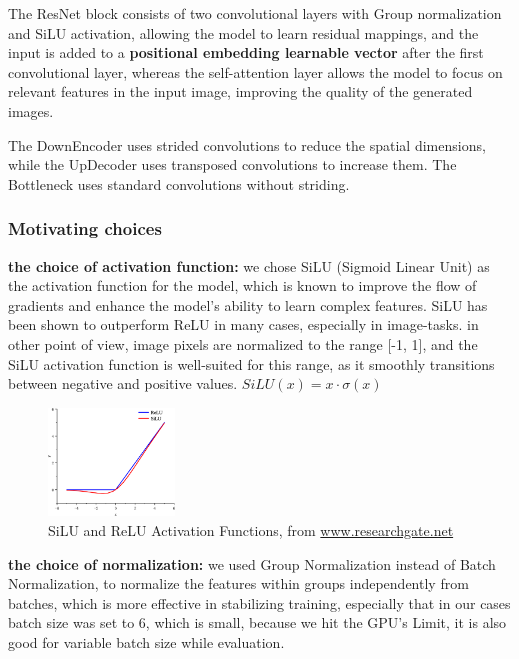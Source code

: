 \documentclass[twocolumn,superscriptaddress,aps]{revtex4-1}
\begin{document}
The ResNet block consists of two convolutional layers with Group normalization and SiLU activation, allowing the model to learn residual mappings, and the input is added to a \textbf{positional embedding learnable vector} after the first convolutional layer, whereas the self-attention layer allows the model to focus on relevant features in the input image, improving the quality of the generated images.

The DownEncoder uses strided convolutions to reduce the spatial dimensions, while the UpDecoder uses transposed convolutions to increase them. The Bottleneck uses standard convolutions without striding.


\subsubsection{Motivating choices}

\textbf{the choice of activation function:} we chose SiLU (Sigmoid Linear Unit) as the activation function for the model, which is known to improve the flow of gradients and enhance the model's ability to learn complex features. SiLU has been shown to outperform ReLU in many cases, especially in image-tasks.
in other point of view, image pixels are normalized to the range [-1, 1], and the SiLU activation function is well-suited for this range, as it smoothly transitions between negative and positive values.
$SiLU(x) = x \cdot \sigma(x)$

\begin{figure}[ht]
    \centering
    \includegraphics[width=0.3\textwidth]{figures/ReLU-and-SiLU-activation-function-curve.png}
    \caption{SiLU and ReLU Activation Functions, from \small{\href{https://www.researchgate.net/figure/ReLU-and-SiLU-activation-function-curve_fig1_363232692}{www.researchgate.net}} }
    \label{fig:silu}
\end{figure}


\textbf{the choice of normalization:} we used Group Normalization instead of Batch Normalization, to normalize the features within groups independently from batches, which is more effective in stabilizing training, especially that in our cases batch size was set to 6, which is small, because we hit the GPU's Limit, it is also good for variable batch size while evaluation.
\end{document}
